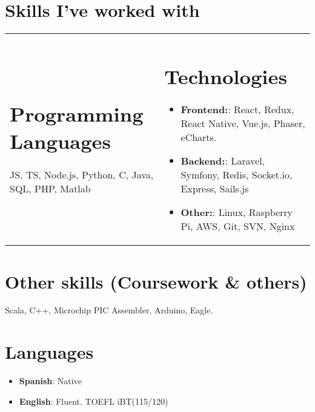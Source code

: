 \documentclass[letterpaper,11pt]{article}
\newcommand{\resumeItem}[2]{
  \item\small{
    \textbf{#1}{: #2 \vspace{-2pt}}
  }
}
\newcommand{\resumeSubItem}[2]{\resumeItem{#1}{#2}\vspace{-4pt}}
\newcommand{\resumeItemListStart}{\begin{itemize}}
\newcommand{\resumeItemListEnd}{\end{itemize}\vspace{-5pt}}
\begin{document}
  \section{Skills I've worked with}
  \vspace{-30pt}
\begin{tabular}{p{9cm}p{9cm}}
  \section{Programming Languages}
  JS, TS, Node.js, Python, C, Java, SQL, PHP, Matlab
  \hfill &

  \section{Technologies}
    \resumeItemListStart
    \resumeSubItem{Frontend:}{React, Redux, React Native, Vue.js, Phaser, eCharts.}
    \resumeSubItem{Backend:}{Laravel, Symfony, Redis, Socket.io, Express, Sails.js}
    \resumeSubItem{Other:}{Linux, Raspberry Pi, AWS, Git, SVN, Nginx}
    \resumeItemListEnd
  \end{tabular}

  \section{Other skills (Coursework \& others)}
    Scala, C++, Microchip PIC Assembler, Arduino, Eagle.

  \section{Languages}
  \resumeItemListStart
  \resumeSubItem{Spanish}{Native}
  \resumeSubItem{English}{Fluent. TOEFL iBT(115/120)}
  \resumeItemListEnd
\end{document}
